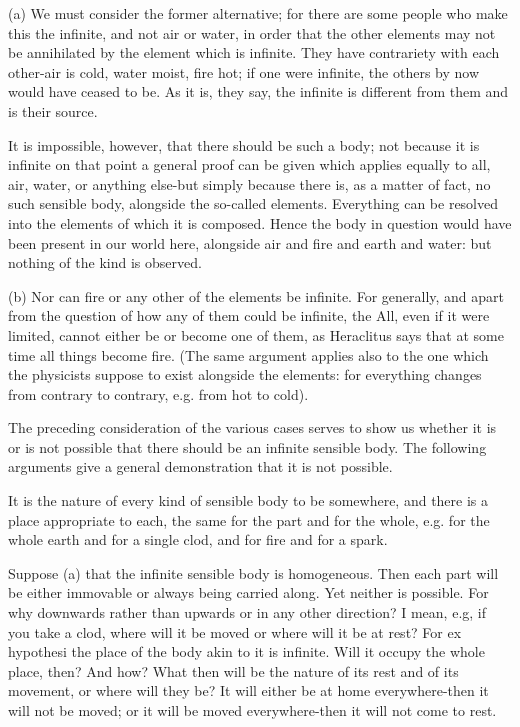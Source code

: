 (a) We must consider the former alternative; for there are some people
who make this the infinite, and not air or water, in order that the
other elements may not be annihilated by the element which is infinite.
They have contrariety with each other-air is cold, water moist, fire
hot; if one were infinite, the others by now would have ceased to
be. As it is, they say, the infinite is different from them and is
their source. 

It is impossible, however, that there should be such a body; not because
it is infinite on that point a general proof can be given which applies
equally to all, air, water, or anything else-but simply because there
is, as a matter of fact, no such sensible body, alongside the so-called
elements. Everything can be resolved into the elements of which it
is composed. Hence the body in question would have been present in
our world here, alongside air and fire and earth and water: but nothing
of the kind is observed. 

(b) Nor can fire or any other of the elements be infinite. For generally,
and apart from the question of how any of them could be infinite,
the All, even if it were limited, cannot either be or become one of
them, as Heraclitus says that at some time all things become fire.
(The same argument applies also to the one which the physicists suppose
to exist alongside the elements: for everything changes from contrary
to contrary, e.g. from hot to cold). 

The preceding consideration of the various cases serves to show us
whether it is or is not possible that there should be an infinite
sensible body. The following arguments give a general demonstration
that it is not possible. 

It is the nature of every kind of sensible body to be somewhere, and
there is a place appropriate to each, the same for the part and for
the whole, e.g. for the whole earth and for a single clod, and for
fire and for a spark. 

Suppose (a) that the infinite sensible body is homogeneous. Then each
part will be either immovable or always being carried along. Yet neither
is possible. For why downwards rather than upwards or in any other
direction? I mean, e.g, if you take a clod, where will it be moved
or where will it be at rest? For ex hypothesi the place of the body
akin to it is infinite. Will it occupy the whole place, then? And
how? What then will be the nature of its rest and of its movement,
or where will they be? It will either be at home everywhere-then it
will not be moved; or it will be moved everywhere-then it will not
come to rest. 


